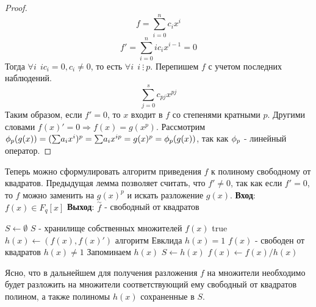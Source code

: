 \begin{proof}
  \[ f = \overset{n}{\underset{i=0}{\sum}} c_{i}x^{i} \]
  \[ f' = \overset{n}{\underset{i=0}{\sum}} ic_{i}x^{i - 1} = 0 \]
  Тогда $ \forall i ~~ ic_i = 0, c_i \ne 0 $, то есть $ \forall i ~~ i ~ \vdots ~ p $. 
  Перепишем $ f $ с учетом последних наблюдений.
  \[ \overset{s}{\underset{j = 0}{\sum}} c_{pj}x^{pj} \]
  Таким образом, если $ f' = 0 $, то $ x $ входит в $ f $ со степенями кратными $ p $. Другими словами
  $ f(x)' = 0 \Rightarrow f(x) = g(x^p) $. 
  Рассмотрим $ \phi_{p}(g(x)) = ({\sum}a_ix^i)^p = {\sum}a_ix^{ip} = g(x)^p = \phi_{p}(g(x)) $, так как $ \phi_{p} $ -
  линейный оператор. 
\end{proof}

Теперь можно сформулировать алгоритм приведения $ f $ к полиному свободному от квадратов. Предыдущая лемма
позволяет считать, что $ f' \ne 0 $, так как если $ f' = 0 $, то $ f $ можно заменить на $ g(x)^p $ и искать
разложение $ g(x) $. \newline  \newline
{\bf{Вход}}: $ f(x) \in F_q[x] $ {\bf{Выход}}: $ \overset{\sim}{f} $ - свободный от квадратов \newline

\begin{codebox}
    \li $ S \gets \emptyset $ \Comment $ S $ - хранилище собственных множителей $ f(x) $
    \li \While true
      \li \Do $ h(x) \gets (f(x), f(x)') $ \Comment алгоритм Евклида
      \li \If $ h(x) = 1 $ 
        \li \Do \Return \Comment $ f(x) $ - свободен от квадратов
	\li \End
      \li \If $ h(x) \ne 1 $
       \li \Comment Запоминаем $ h(x) $
        \li \Do $ S \gets h(x) $ 
	  \li $ f(x) \gets f(x) / h(x) $
\end{codebox}

Ясно, что в дальнейшем для получения разложения $ f $ на множители необходимо будет разложить на множители
соответствующий ему свободный от квадратов полином, а также полиномы $ h(x) $ сохраненные в $ S $.



